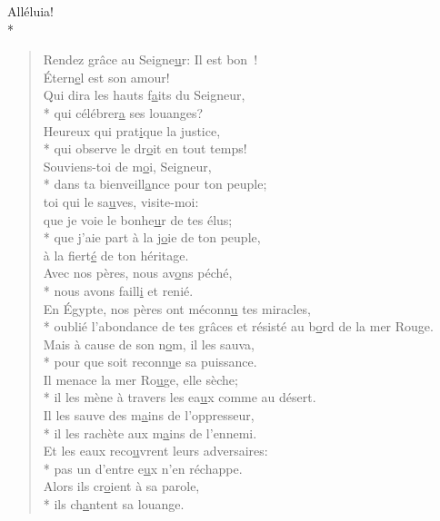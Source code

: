 Alléluia! \\*

\begin{verse}
Rendez grâce au Seigne\underline{u}r: Il est bon ! \\
Étern\underline{e}l est son amour! \\
Qui dira les hauts f\underline{a}its du Seigneur, \\*
qui célébrer\underline{a} ses louanges? \\
Heureux qui prat\underline{i}que la justice, \\*
qui observe le dr\underline{o}it en tout temps! \\

Souviens-toi de m\underline{o}i, Seigneur, \\*
dans ta bienveill\underline{a}nce pour ton peuple; \\
toi qui le sa\underline{u}ves, visite-moi: \\
que je voie le bonhe\underline{u}r de tes élus; \\*
que j’aie part à la j\underline{o}ie de ton peuple, \\
à la fiert\underline{é} de ton héritage. \\

Avec nos pères, nous av\underline{o}ns péché, \\*
nous avons faill\underline{i} et renié. \\
En Égypte, nos pères ont méconn\underline{u} tes miracles, \\*
oublié l’abondance de tes grâces
et résisté au b\underline{o}rd de la mer Rouge. \\
Mais à cause de son n\underline{o}m, il les sauva, \\*
pour que soit reconn\underline{u}e sa puissance. \\

Il menace la mer Ro\underline{u}ge, elle sèche; \\*
il les mène à travers les ea\underline{u}x comme au désert. \\
Il les sauve des m\underline{a}ins de l’oppresseur, \\*
il les rachète aux m\underline{a}ins de l’ennemi. \\

Et les eaux reco\underline{u}vrent leurs adversaires: \\*
pas un d’entre e\underline{u}x n’en réchappe. \\
Alors ils cr\underline{o}ient à sa parole, \\*
ils ch\underline{a}ntent sa louange. \\


\end{verse}
